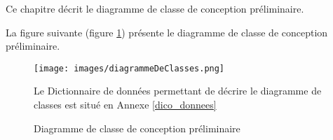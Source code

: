Ce chapitre décrit le diagramme de classe de conception préliminaire.

La figure suivante (figure \ref{diagrammeClasse}) présente le diagramme de classe de conception préliminaire.
\begin{figure}[H]
	\centering
	\texttt{[image: images/diagrammeDeClasses.png]}
	\caption{Diagramme de classe de conception préliminaire}
	\label{diagrammeClasse}
	Le Dictionnaire de données permettant de décrire le diagramme de classes est situé en Annexe \ref{dico_donnees} 
\end{figure}